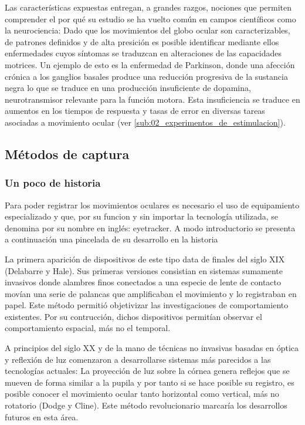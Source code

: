 \documentclass[../main.tex]{subfiles}
\begin{document}
		Las características expuestas entregan, a grandes razgos, nociones que permiten comprender el por qué su estudio se ha vuelto común en campos científicos como la neurociencia: Dado que los movimientos del globo ocular son caracterizables, de patrones definidos y de alta presición es posible identificar mediante ellos enfermedades cuyos síntomas se traduzcan en alteraciones de las capacidades motrices. Un ejemplo de esto es la enfermedad de Parkinson, donde una afección crónica a los ganglios basales produce una reducción progresiva de la sustancia negra lo que se traduce en una producción insuficiente de dopamina, neurotransmisor relevante para la función motora. Esta insuficiencia se traduce en aumentos en los tiempos de respuesta y tasas de error en diversas tareas asociadas a movimiento ocular (ver \ref{sub:02_experimentos_de_estimulacion}).    

		\newpage
		\subsection{Métodos de captura}
		\label{sub:02_metodos_de_captura}
			\subsubsection{Un poco de historia} 
			\label{ssub:02_un_poco_de_historia_monitores}
			
			Para poder registrar los movimientos oculares es necesario el uso de equipamiento especializado y que, por su funcion y sin importar la tecnología utilizada, se denomina por su nombre en inglés: \gls{eyetracker}. A modo introductorio se presenta a continuación una pincelada de su desarrollo en la historia \cite{article:eyetracker_eggert, article:eyetracker_richardson}

			La primera aparición de dispositivos de este tipo data de finales del siglo XIX (Delabarre y Hale). Sus primeras versiones consistian en sistemas sumamente invasivos donde alambres finos conectados a una especie de lente de contacto movían una serie de palancas que amplificaban el movimiento y lo registraban en papel. Este método permitió objetivizar las investigaciones de comportamiento existentes. Por su contrucción, dichos dispositivos permitían observar el comportamiento espacial, más no el temporal. 

			A principios del siglo XX y de la mano de técnicas no invasivas basadas en óptica y reflexión de luz comenzaron a desarrollarse sistemas más parecidos a las tecnologías actuales: La proyección de luz sobre la córnea genera reflejos que se mueven de forma similar a la pupila y por tanto si se hace posible su registro, es posible conocer el movimiento ocular tanto horizontal como vertical, más no rotatorio (Dodge y Cline). Este método revolucionario marcaría los desarrollos futuros en esta área.
\end{document}
